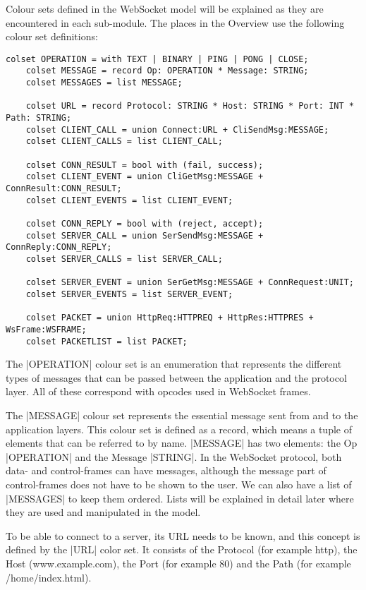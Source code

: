 	Colour sets defined in the WebSocket model will be explained as they are
	encountered in each sub-module. The places in the Overview use the following
	colour set definitions:
	
	\begin{lstlisting}[label=lst:overview_colset,caption=Overview colour sets,gobble=1] 
	colset OPERATION = with TEXT | BINARY | PING | PONG | CLOSE; 
	colset MESSAGE = record Op: OPERATION *	Message: STRING;
	colset MESSAGES = list MESSAGE;
	
	colset URL = record Protocol: STRING * Host: STRING * Port: INT * Path: STRING;
	colset CLIENT_CALL = union Connect:URL + CliSendMsg:MESSAGE;
	colset CLIENT_CALLS = list CLIENT_CALL;
	
	colset CONN_RESULT = bool with (fail, success);
	colset CLIENT_EVENT = union CliGetMsg:MESSAGE + ConnResult:CONN_RESULT;
	colset CLIENT_EVENTS = list CLIENT_EVENT;
	
	colset CONN_REPLY = bool with (reject, accept);
	colset SERVER_CALL = union SerSendMsg:MESSAGE + ConnReply:CONN_REPLY;
	colset SERVER_CALLS = list SERVER_CALL;
	
	colset SERVER_EVENT = union SerGetMsg:MESSAGE + ConnRequest:UNIT;
	colset SERVER_EVENTS = list SERVER_EVENT;
	
	colset PACKET = union HttpReq:HTTPREQ + HttpRes:HTTPRES + WsFrame:WSFRAME;
	colset PACKETLIST = list PACKET;
	\end{lstlisting}
	
	The |OPERATION| colour set is an enumeration that represents the
	different types of messages that can be passed between the application and the
	protocol layer. All of these correspond with opcodes used in WebSocket frames.
	
	The |MESSAGE| colour set represents the essential message sent from and to the
	application layers. This colour set is defined as a record, which means a tuple
	of elements that can be referred to by name. |MESSAGE| has two elements: the Op
	|OPERATION| and the Message |STRING|. In the WebSocket protocol, both data- and
	control-frames can have messages, although the message part of control-frames
	does not have to be shown to the user. We can also have a list of |MESSAGES| to
	keep them ordered. Lists will be explained in detail later where they are used and
	manipulated in the model.
	
	To be able to connect to a server, its URL needs to be known, and this concept
	is defined by the |URL| color set. It consists of the Protocol (for
	example http), the Host (www.example.com), the Port (for example 80) and the
	Path (for example /home/index.html).
	
